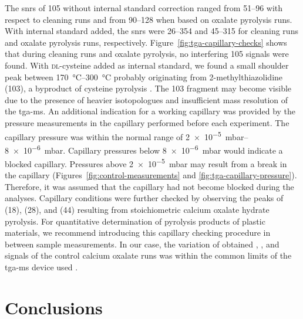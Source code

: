 The \acp{snr} of \SI{105}{\mz} without internal standard correction ranged from \numrange[range-phrase = { to }]{51}{96} with respect to cleaning runs and from \numrange[range-phrase = { to }]{90}{128} when based on oxalate pyrolysis runs.
With internal standard added, the \acp{snr} were \numrange{26}{354} and \numrange{45}{315} for cleaning runs and oxalate pyrolysis runs, respectively. Figure~\ref{fig:tga-capillary-checks} shows that during cleaning runs and oxalate pyrolysis, no interfering \SI{105}{\mz} signals were found. With \textsc{dl}-cysteine added as internal standard, we found a small shoulder peak between \SIrange[range-phrase = { and }]{170}{300}{\degreeCelsius} probably originating from 2-methylthiazolidine (\SI{103}{\mz}), a byproduct of cysteine pyrolysis \citep{FujimakiPyrolysis1969}.
The \SI{103}{\mz} fragment may become visible due to the presence of heavier isotopologues and insufficient mass resolution of the \ac{tga-ms}. An additional indication for a working capillary was provided by the pressure measurements in the capillary performed before each experiment. The capillary pressure was within the normal range of \SIrange[range-phrase = { to }]{2e-5}{8e-6}{\milli\bar}.
Capillary pressures below \SI{8e-6}{\milli\bar} would indicate a blocked capillary. Pressures above \SI{2e-5}{\milli\bar} may result from a break in the capillary (Figures~\ref{fig:control-measurements} and \ref{fig:tga-capillary-pressure}). Therefore, it was assumed that the capillary had not become blocked during the analyses. Capillary conditions were further checked by observing the peaks of  (\SI{18}{\mz}),  (\SI{28}{\mz}), and  (\SI{44}{\mz}) resulting from stoichiometric calcium oxalate hydrate pyrolysis.
For quantitative determination of pyrolysis products of plastic materials, we recommend introducing this capillary checking procedure
in between sample measurements. In our case, the variation of obtained , , and  signals of the control calcium oxalate runs was within the common limits of the \ac{tga-ms} device used \citep{NETZSCHGeratebauMS2010}.

\section{Conclusions}

